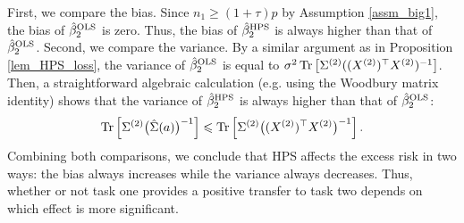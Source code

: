 First, we compare the bias. Since $n_1 \ge (1 + \tau) p$ by Assumption \ref{assm_big1}, the bias of $\hat{\beta}_2^{\textup{OLS}}$ is zero.
Thus, the bias of $\hat{\beta}_2^{\textup{HPS}}$ is always higher than that of $\hat{\beta}_2^{\textup{OLS}}$.
Second, we compare the variance. By a similar argument as in Proposition \ref{lem_HPS_loss}, the variance of $\hat{\beta}_2^{\textup{OLS}}$ is equal to $\sigma^2 \operatorname{Tr}\left[\Sigma^{(2)} ((X^{(2)})^{\top} X^{(2)})^{-1}\right]$.
Then, a straightforward algebraic calculation (e.g. using the Woodbury matrix identity) shows that the variance of $\hat{\beta}_2^{\textup{HPS}}$ is always higher than that of $\hat{\beta}_2^{\textup{OLS}}$:
\begin{align*}
    \operatorname{Tr}\left[\Sigma^{(2)} \big(\hat{\Sigma}(a)\big)^{-1}\right] \leqslant \operatorname{Tr}\left[\Sigma^{(2)} \big((X^{(2)})^{\top} X^{(2)}\big)^{-1}\right].
\end{align*}
Combining both comparisons, we conclude that HPS affects the excess risk in two ways: the bias always increases while the variance always decreases.
Thus, whether or not task one provides a positive transfer to task two depends on which effect is more significant.








